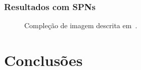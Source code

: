 \documentclass[10pt]{beamer}
\theoremstyle{plain}
\begin{document}
\begin{frame}
  \frametitle{Resultados com SPNs}

  \begin{figure}[h]
    \caption{Compleção de imagem descrita em~\cite{poon-domingos}.}
  \end{figure}
\end{frame}


\section{Conclusões}
\end{document}
